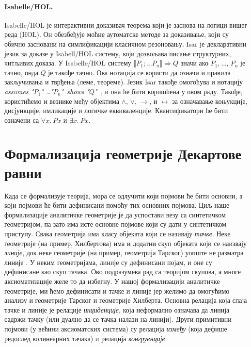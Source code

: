 \documentclass[a4paper, 12pt]{article}
\begin{document}
\paragraph{ Isabelle/HOL.}  Isabelle/HOL је интерактивни
доказивач теорема који је заснова на логици вишег реда (HOL).  Он
обезбеђује моћне аутоматске методе за доказивање, који су обично
засновани на симлификацији класичном резоновању. Isar је декларативни
језик за доказе у Isabell/HOL систему, који дозвољава писање
структурних, читљивих доказа. У Isabelle/HOL систему $\llbracket P_1;
\ldots P_n \rrbracket \Longrightarrow Q$ значи ако $P_1$, \ldots,
$P_n$ је тачно, онда $Q$ је такође тачно. Ова нотација се користи да
означи и правила закључивања и тврђења (леме, теореме).  Језик Isar
такође омогоћува и нотацију {\em assumes "$P_1$" \ldots "$P_n$"\ shows
  "$Q$"\ }, и она ће бити коришћена у овом раду. Такође, користићемо и
везнике међу објектима $\wedge$, $\vee$, $\longrightarrow$, и
$\longleftrightarrow$ за означавање коњукције, дисјункције, имликације
и логичке еквиваленције. Квантификатори ће бити означени са $\forall
x.\ P x$ и $\exists x.\ P x$.

\section{Формализација геометрије Декартове равни}
\label{sec:cartesian}

Када се формализује теорија, мора се одлучити који појмови ће бити
основни, а који појмови ће бити дефинисани помоћу тих основних
појмова. Циљ наше формализације аналитичке геометрије је да успостави
везу са синтетичком геометријом, па зато има исте основне појмове који
су дати у синтетичком приступу. Свака геометрија има класу објеката
који се називају \emph{тачке}. Неке геометрије (на пример, Хилбертова)
има и додатни скуп објеката који се наизвају \emph{линије}, док неке
геометрије (на пример, геометрија Тарског) уопште не разматра линије .
У неким геометријама, линије су дефинисани појам, и оне су дефинисане
као скуп тачака.  Ово подразумева рад са теоријом скупова, а многе
аксиоматизације желе то да избегну.  У нашој формализацији аналитичке
геометрије, ми ћемо дефинисати и тачке и линије јер желимо да
омогућимо анализу и геометрије Тарског и геометрије Хилберта. Основна
релација која спаја тачке и линије је релације \emph{инциденције},
која неформално означава да линија садржи тачку (или дуално да се
тачка налази на линији). Други примитивни појмови (у већини
аксиоматских система) су релација \emph{између} (која дефише редослед
колинеарних тачака) и релација \emph{конгруенције}.
\end{document}
